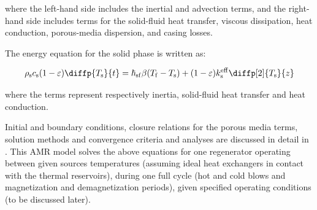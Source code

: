 \documentclass[referee]{svjour3}
\begin{document}
\noindent where the left-hand side includes the inertial and advection terms, and the right-hand side includes terms for the solid-fluid heat transfer, viscous dissipation, heat conduction, porous-media dispersion, and casing losses.





The energy equation for the solid phase is written as:

\begin{equation}
\label{eq:88}
  \rho\ped{s} c\ped{s}(1 - \varepsilon)\diffp{T\ped{s}}{t} = \hheat\ped{sf}\beta(T\ped{f}-T\ped{s}) + (1-\varepsilon)k\ped{s}\ap{eff}\diffp[2]{T\ped{s}}{z}
\end{equation}

\noindent where the terms represent respectively inertia, solid-fluid heat transfer and heat conduction.

Initial and boundary conditions, closure relations for the porous media terms, solution methods and convergence criteria and analyses are discussed in detail in \cite{bib:trevizoli16_perfor_model}. This AMR model solves the above equations for one regenerator operating between given sources temperatures (assuming ideal heat exchangers in contact with the thermal reservoirs), during one full cycle (hot and cold blows and  magnetization and demagnetization periods), given specified operating conditions (to be discussed later).
\end{document}
